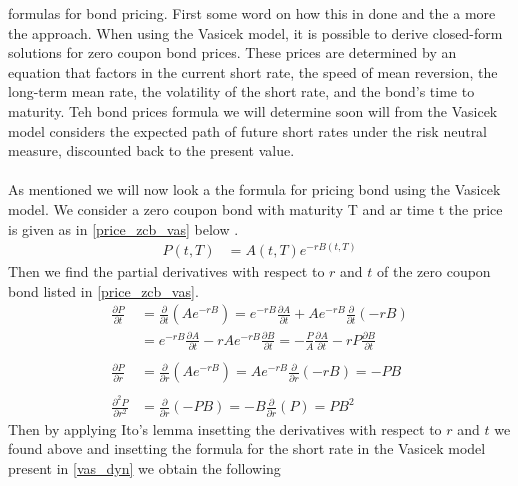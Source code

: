 formulas for bond pricing. First some word on how this in done and the a more the approach. 
When using the Vasicek model, it is possible to derive closed-form solutions for zero coupon bond prices. 
These prices are determined by an equation that factors in the current short rate, the speed of mean reversion,
the long-term mean rate, the volatility of the short rate, and the bond’s time to maturity.
Teh bond prices formula we will determine soon will from the Vasicek model considers the expected path of future short 
rates under the risk neutral measure, discounted back to the present value. 
\\\\
As mentioned we will now look a the formula for pricing bond using the Vasicek model. We consider a zero coupon bond
with maturity T and ar time t the price is given as in \autoref{price_zcb_vas} below \cite{Bjork}.
\begin{align}
    P(t,T) &= A(t,T) e^{-rB(t,T)} 
    \label{price_zcb_vas} 
\end{align}
Then we find the partial derivatives with respect to $r$ and $t$ of the zero coupon bond listed in \autoref{price_zcb_vas}.
\begin{align*}
    \frac{\partial P}{\partial t} &= \frac{\partial}{\partial t} (Ae^{-rB}) 
    = e^{-rB} \frac{\partial A}{\partial t} + Ae^{-rB} \frac{\partial}{\partial t} (-rB) \\
    &= e^{-rB} \frac{\partial A}{\partial t} - rAe^{-rB} \frac{\partial B}{\partial t} = 
    - \frac{P}{A} \frac{\partial A}{\partial t} - rP \frac{\partial B}{\partial t}
    \\\\
    \frac{\partial P}{\partial r} &= \frac{\partial}{\partial r} (Ae^{-rB}) 
    = Ae^{-rB} \frac{\partial}{\partial r} (-rB) = -PB 
    \\\\
    \frac{\partial^2 P}{\partial r^2} &= \frac{\partial}{\partial r} (-PB) = -B \frac{\partial}{\partial r} (P) = PB^2
\end{align*}
Then by applying Ito's lemma \cite{Bjork} insetting the derivatives with respect to $r$ and $t$ we found above and
insetting the formula for the short rate in the Vasicek model present in \autoref{vas_dyn} we obtain the following
